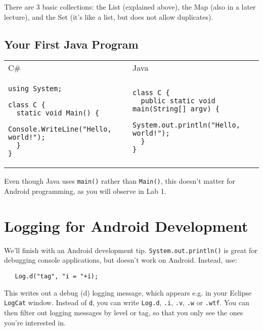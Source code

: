 There are 3 basic collections: the List (explained above), the Map (also in a later lecture), and the Set (it's like a list, but does not allow duplicates).

\subsection*{Your First Java Program}

\begin{tabular}{ll}
C\# & Java \\
\begin{minipage}{.45\textwidth} \begin{verbatim}
using System;

class C {
  static void Main() {
    Console.WriteLine("Hello, world!");
  }
}
\end{verbatim} 
\end{minipage} &
\begin{minipage}{.45\textwidth} \begin{verbatim}
class C {
  public static void main(String[] argv) {
    System.out.println("Hello, world!");
  }
}
\end{verbatim} 
\end{minipage} 
\end{tabular}

Even though Java uses {\tt main()} rather than {\tt Main()}, 
this doesn't matter for Android programming, as you will
observe in Lab 1.

\vspace*{-1em}

\section*{Logging for Android Development}
\vspace*{-1em}
We'll finish with an Android development tip. {\tt System.out.println()} is great
for debugging console applications, but doesn't work on Android. Instead, use:

{\tt ~~~Log.d("tag", "i = "+i); }

This writes out a debug (d) logging message, which appears e.g. in your Eclipse
{\tt LogCat} window. Instead of {\tt d}, you can write {\tt Log.d},
{\tt .i}, {\tt .v}, {\tt .w} or {\tt .wtf}. You can then filter out logging messages
by level or tag, so that you only see the ones you're interested in.




\newpage

